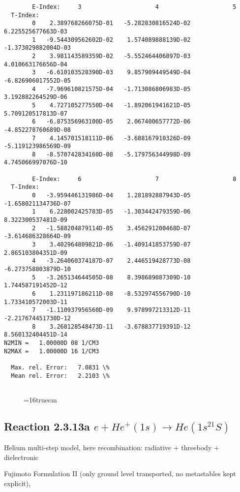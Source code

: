 \documentclass[12pt,dvipdfmx]{article}
\begin{document}
{\begin{small}
\begin{verbatim}
        E-Index:     3                     4                     5
  T-Index:
        0    2.389768266075D-01   -5.282830816524D-02    6.225525677663D-03
        1   -9.544309562602D-02    1.574089888139D-02   -1.373029882004D-03
        2    3.981143589359D-02   -5.552464406897D-03    4.010663176656D-04
        3   -6.610103528390D-03    9.857909449549D-04   -6.826906017552D-05
        4   -7.969610821575D-04   -1.713086806983D-05    3.192882264529D-06
        5    4.727105277550D-04   -1.892061941621D-05    5.709120517813D-07
        6   -6.875356963100D-05    2.067400657772D-06   -4.852278760689D-08
        7    4.145701518111D-06   -3.688167910326D-09   -5.119123986569D-09
        8   -8.570742834160D-08   -5.179756344998D-09    4.745066997076D-10

        E-Index:     6                     7                     8
  T-Index:
        0   -3.959446131986D-04    1.281892887943D-05   -1.658021134736D-07
        1    6.228002425783D-05   -1.303442479359D-06    8.322300537481D-09
        2   -1.588204879114D-05    3.456291200468D-07   -3.614686328664D-09
        3    3.402964809821D-06   -1.409141853759D-07    2.865103804351D-09
        4   -3.264060374187D-07    2.446519428773D-08   -6.273758803879D-10
        5   -3.265134644505D-08    8.398689087309D-10    1.744587191452D-12
        6    1.231197186211D-08   -8.532974556790D-10    1.733410572003D-11
        7   -1.110937956560D-09    9.978997213312D-11   -2.217674451730D-12
        8    3.268128548473D-11   -3.678837719391D-12    8.560132404451D-14
N2MIN =   1.00000D 08 1/CM3
N2MAX =   1.00000D 16 1/CM3

  Max. rel. Error:   7.0831 \%
  Mean rel. Error:   2.2103 \%


\end{verbatim}\end{small}
\begin{figure} \label{2.3.9j}
\epsfxsize=16truecm
\end{figure}
\newpage


\subsection{
Reaction 2.3.13a  $e + He^+(1s) \rightarrow He(1s^21S) $
}

Helium multi-step model, here recombination: radiative + threebody + dielectronic

 Fujimoto Formulation II (only ground level transported, no metastables kept
explicit), \cite{kn:Fujimoto}


}
\end{document}
